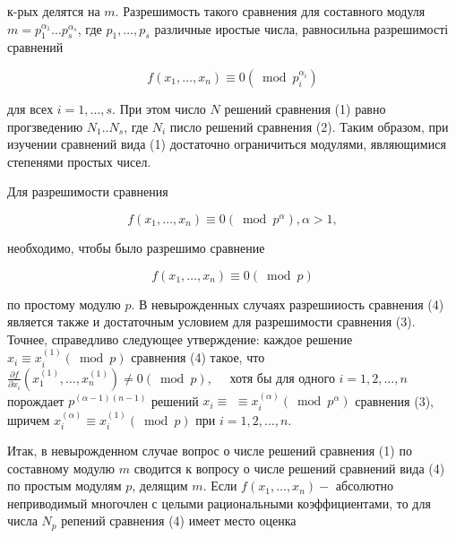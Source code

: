 \documentclass[10pt]{article}
\begin{document}
к-рых делятся на $m$. Разрешимость такого сравнения для составного модуля $m=p_{1}^{\alpha_{1}} \ldots p_{s}^{\alpha_{s}}$, где $p_{1}, \ldots, p_{s}$ различные иростые числа, равносильна разрешимості сравнений



\[

f\left(x_{1}, \ldots, x_{n}\right) \equiv 0\left(\bmod p_{i}^{\alpha_{i}}\right)

\]



для всех $i=1, \ldots, s$. При этом число $N$ решений сравнения (1) равно прогзведению $N_{1} . . N_{s}$, где $N_{i}$ писло решений сравнения (2). Таким образом, при изучении сравнений вида (1) достаточно ограничиться модулями, являющимися степенями простых чисел.



Для разрешимости сравнения



\[

f\left(x_{1}, \ldots, x_{n}\right) \equiv 0\left(\bmod p^{\alpha}\right), \alpha>1,

\]



необходимо, чтобы было разрешимо сравнение



\[

f\left(x_{1}, \ldots, x_{n}\right) \equiv 0(\bmod p)

\]



по простому модулю $p$. В невырожденных случаях разрешииость сравнения (4) является также и достаточным условием для разрешимости сравнения (3). Точнее, справедливо следующее утверждение: каждое решение $x_{i} \equiv x_{i}^{(1)}(\bmod p)$ сравнения (4) такое, что $\frac{\partial f}{\partial x_{i}}\left(x_{1}^{(1)}, \ldots, x_{n}^{(1)}\right) \neq 0(\bmod p), \quad$ хотя бы для одного $i=1,2, \ldots, n$ порождает $p^{(\alpha-1)(n-1)}$ решений $x_{i} \equiv$ $\equiv x_{i}^{(\alpha)}\left(\bmod p^{\alpha}\right)$ сравнения (3), шричем $x_{i}^{(\alpha)} \equiv x_{i}^{(1)}(\bmod p)$ при $i=1,2, \ldots, n$.



Итак, в невырожденном случае вопрос о числе решений сравнения (1) по составному модулю $m$ сводится к вопросу о числе решений сравнений вида (4) по простым модулям $p$, делящим $m$. Если $f\left(x_{1}, \ldots, x_{n}\right)-$ абсолютно неприводимый многочлен с целыми рациональными коэффициентами, то для числа $N_{p}$ репений сравнения (4) имеет место оценка
\end{document}
